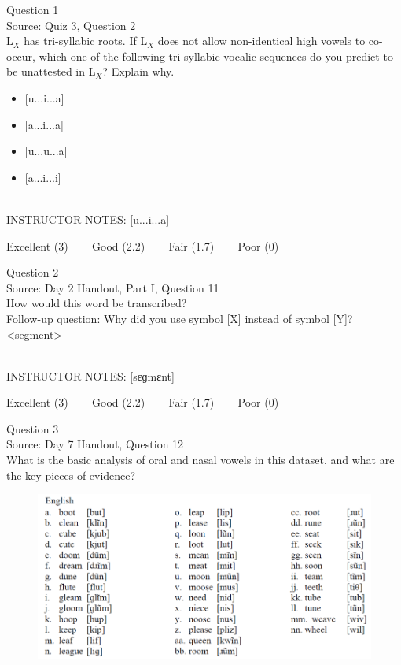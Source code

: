 \documentclass[12pt]{article}
\begin{document}
{\large Question 1}\\

Source: Quiz 3, Question 2\\

L$_X$ has tri-syllabic roots. If L$_X$ does not allow non-identical high vowels to co-occur, which one of the following tri-syllabic vocalic sequences do you predict to be unattested in L$_X$? Explain why.\\

\begin{itemize} \item {[u...i...a]} \item {[a...i...a]} \item {[u...u...a]} \item {[a...i...i]} \end{itemize}


~\\
INSTRUCTOR NOTES: [u...i...a]


\vfill
Excellent (3) ~~~ Good (2.2) ~~~ Fair (1.7) ~~~ Poor (0)
\newpage

{\large Question 2}\\

Source: Day 2 Handout, Part I, Question 11\\

How would this word be transcribed?\\ Follow-up question: Why did you use symbol [X] instead of symbol [Y]?\\

<segment>


~\\
INSTRUCTOR NOTES: [sɛɡmɛnt]


\vfill
Excellent (3) ~~~ Good (2.2) ~~~ Fair (1.7) ~~~ Poor (0)
\newpage

{\large Question 3}\\

Source: Day 7 Handout, Question 12\\

What is the basic analysis of oral and nasal vowels in this dataset, and what are the key pieces of evidence?\\

\begin{figure}[H]
\includegraphics{../images/english12.png}
\end{figure}
\end{document}
